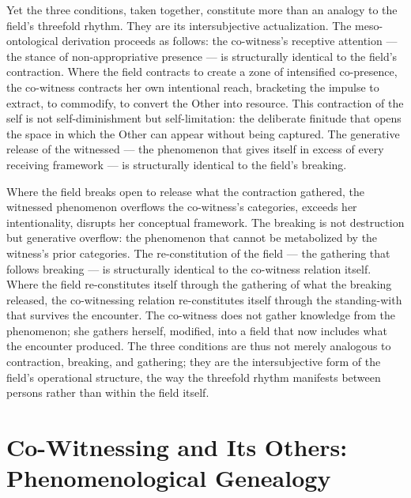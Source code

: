 Yet the three conditions, taken together, constitute more than an analogy to the field's threefold rhythm. They are its intersubjective actualization. The meso-ontological derivation proceeds as follows: the co-witness's receptive attention — the stance of non-appropriative presence — is structurally identical to the field's contraction. Where the field contracts to create a zone of intensified co-presence, the co-witness contracts her own intentional reach, bracketing the impulse to extract, to commodify, to convert the Other into resource. This contraction of the self is not self-diminishment but self-limitation: the deliberate finitude that opens the space in which the Other can appear without being captured. The generative release of the witnessed — the phenomenon that gives itself in excess of every receiving framework — is structurally identical to the field's breaking.

Where the field breaks open to release what the contraction gathered, the witnessed phenomenon overflows the co-witness's categories, exceeds her intentionality, disrupts her conceptual framework. The breaking is not destruction but generative overflow: the phenomenon that cannot be metabolized by the witness's prior categories. The re-constitution of the field — the gathering that follows breaking — is structurally identical to the co-witness relation itself. Where the field re-constitutes itself through the gathering of what the breaking released, the co-witnessing relation re-constitutes itself through the standing-with that survives the encounter. The co-witness does not gather knowledge from the phenomenon; she gathers herself, modified, into a field that now includes what the encounter produced. The three conditions are thus not merely analogous to contraction, breaking, and gathering; they are the intersubjective form of the field's operational structure, the way the threefold rhythm manifests between persons rather than within the field itself.

\section{Co-Witnessing and Its Others: Phenomenological Genealogy}

